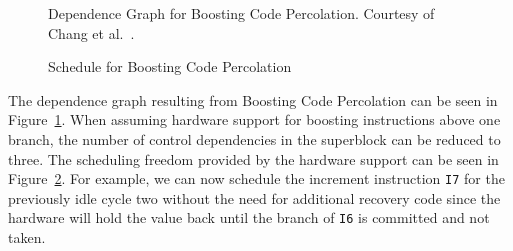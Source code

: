\begin{center}
    \begin{minipage}{.52\textwidth}
        \begin{figure}[H]
            \centering
            
            \caption[Dependence Graph for Boosting Code Percolation]{Dependence Graph for Boosting Code Percolation. Courtesy of Chang et al.~\cite{chang95}.}
            \label{fig:boosting_cfg}
\end{figure}
    \end{minipage}\hfill
    \begin{minipage}{.46\textwidth}
\begin{figure}[H]
            \centering
            \resizebox{1\textwidth}{!}{
            
        }
        \caption[Schedule for Boosting Code Percolation]{Schedule for Boosting Code Percolation}
        \label{fig:boosted_motion}
\end{figure}
    \end{minipage}
\end{center} 
The dependence graph resulting from Boosting Code Percolation can be seen in Figure~\ref{fig:boosting_cfg}. When assuming hardware support for boosting instructions above one branch, the number of control dependencies in the superblock can be reduced to three. The scheduling freedom provided by the hardware support can be seen in Figure~\ref{fig:boosted_motion}. For example, we can now schedule the increment instruction \texttt{I7} for the previously idle cycle two without the need for additional recovery code since the hardware will hold the value back until the branch of \texttt{I6} is committed and not taken. 

